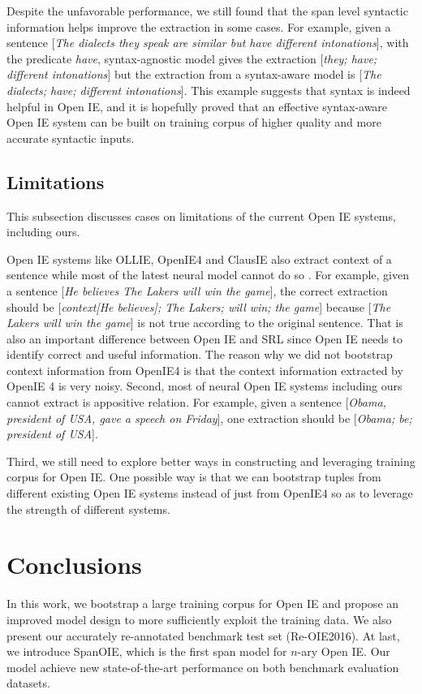 \documentclass[letterpaper]{article} %
\begin{document}
Despite the unfavorable performance, we still found that the span level syntactic information helps improve the extraction in some cases. For example, given a sentence [\emph{The dialects they speak are similar but have different intonations}], with the predicate \emph{have}, syntax-agnostic model gives the extraction [\emph{they; have; different intonations}] but the extraction from a syntax-aware model is [\emph{The dialects; have; different intonations}]. This example suggests that syntax is indeed helpful in Open IE, and it is hopefully proved that an effective syntax-aware Open IE system can be built on training corpus of higher quality and more accurate syntactic inputs.

\subsection{Limitations}
This subsection discusses cases on limitations of the current Open IE systems, including ours.

Open IE systems like OLLIE, OpenIE4 and ClausIE also extract context of a sentence while most of the latest neural model cannot do so
. For example, given a sentence [\emph{He believes The Lakers will win the game}], the correct extraction should be [\emph{context[He believes]; The Lakers; will win; the game}] because [\emph{The Lakers will win the game}] is not true according to the original sentence. That is also an important difference between Open IE and SRL since Open IE needs to identify correct and useful information. The reason why we did not bootstrap context information from OpenIE4 is that the context information extracted by OpenIE 4 is very noisy. Second, most of neural Open IE systems including ours cannot extract is appositive relation. For example, given a sentence [\emph{Obama, president of USA, gave a speech on Friday}], one extraction should be [\emph{Obama; be; president of USA}].

Third, we still need to explore better ways in constructing and leveraging training corpus for Open IE. One possible way is that we can bootstrap tuples from different existing Open IE systems instead of just from OpenIE4 so as to leverage the strength of different systems.

\section{Conclusions}
In this work, we bootstrap a large training corpus for Open IE and propose an improved model design to more sufficiently exploit the training data. We also present our accurately re-annotated benchmark test set (Re-OIE2016). At last, we introduce SpanOIE, which is the first span model for $n$-ary Open IE. Our model achieve new state-of-the-art performance on both benchmark evaluation datasets.



\end{document}

